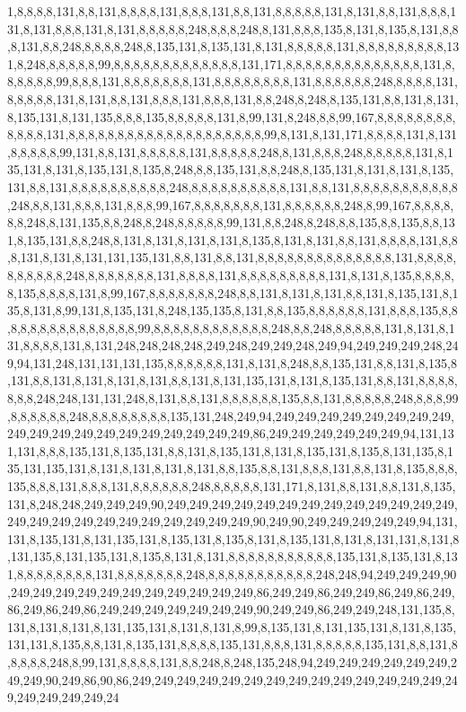 1,8,8,8,8,131,8,8,131,8,8,8,8,131,8,8,8,131,8,8,131,8,8,8,8,8,131,8,131,8,8,131,8,8,8,131,8,131,8,8,8,131,8,131,8,8,8,8,8,248,8,8,8,248,8,131,8,8,8,135,8,131,8,135,8,131,8,8,8,131,8,8,248,8,8,8,8,248,8,135,131,8,135,131,8,131,8,8,8,8,8,131,8,8,8,8,8,8,8,8,8,131,8,248,8,8,8,8,8,99,8,8,8,8,8,8,8,8,8,8,8,8,8,131,171,8,8,8,8,8,8,8,8,8,8,8,8,8,8,131,8,8,8,8,8,8,99,8,8,8,131,8,8,8,8,8,8,8,131,8,8,8,8,8,8,8,8,131,8,8,8,8,8,8,248,8,8,8,8,131,8,8,8,8,8,131,8,131,8,8,131,8,8,8,131,8,8,8,131,8,8,248,8,248,8,135,131,8,8,131,8,131,8,135,131,8,131,135,8,8,8,135,8,8,8,8,8,131,8,99,131,8,248,8,8,99,167,8,8,8,8,8,8,8,8,8,8,8,8,131,8,8,8,8,8,8,8,8,8,8,8,8,8,8,8,8,8,8,8,8,99,8,131,8,131,171,8,8,8,8,131,8,131,8,8,8,8,8,99,131,8,8,131,8,8,8,8,8,131,8,8,8,8,8,248,8,131,8,8,8,248,8,8,8,8,8,131,8,135,131,8,131,8,135,131,8,135,8,248,8,8,135,131,8,8,248,8,135,131,8,131,8,131,8,135,131,8,8,131,8,8,8,8,8,8,8,8,8,8,248,8,8,8,8,8,8,8,8,8,8,131,8,8,131,8,8,8,8,8,8,8,8,8,8,8,248,8,8,131,8,8,8,131,8,8,8,99,167,8,8,8,8,8,8,8,131,8,8,8,8,8,8,248,8,99,167,8,8,8,8,8,8,248,8,131,135,8,8,248,8,248,8,8,8,8,8,99,131,8,8,248,8,248,8,8,135,8,8,135,8,8,131,8,135,131,8,8,248,8,131,8,131,8,131,8,131,8,135,8,131,8,131,8,8,131,8,8,8,8,131,8,8,8,131,8,131,8,131,131,135,131,8,8,131,8,8,131,8,8,8,8,8,8,8,8,8,8,8,8,8,8,131,8,8,8,8,8,8,8,8,8,8,248,8,8,8,8,8,8,8,131,8,8,8,8,131,8,8,8,8,8,8,8,8,8,131,8,131,8,135,8,8,8,8,8,135,8,8,8,8,131,8,99,167,8,8,8,8,8,8,8,248,8,8,131,8,131,8,131,8,8,131,8,135,131,8,135,8,131,8,99,131,8,135,131,8,248,135,135,8,131,8,8,135,8,8,8,8,8,8,131,8,8,8,135,8,8,8,8,8,8,8,8,8,8,8,8,8,8,8,99,8,8,8,8,8,8,8,8,8,8,8,8,248,8,8,248,8,8,8,8,8,131,8,131,8,131,8,8,8,8,131,8,131,248,248,248,248,249,248,249,249,248,249,94,249,249,249,248,249,94,131,248,131,131,131,135,8,8,8,8,8,8,131,8,131,8,248,8,8,135,131,8,8,131,8,135,8,131,8,8,131,8,131,8,131,8,131,8,8,131,8,131,135,131,8,131,8,135,131,8,8,131,8,8,8,8,8,8,8,248,248,131,131,248,8,131,8,8,131,8,8,8,8,8,8,135,8,8,131,8,8,8,8,8,248,8,8,8,99,8,8,8,8,8,8,248,8,8,8,8,8,8,8,8,135,131,248,249,94,249,249,249,249,249,249,249,249,249,249,249,249,249,249,249,249,249,249,249,86,249,249,249,249,249,249,94,131,131,131,8,8,8,135,131,8,135,131,8,8,131,8,135,131,8,131,8,135,131,8,135,8,131,135,8,135,131,135,131,8,131,8,131,8,131,8,131,8,8,135,8,8,131,8,8,8,131,8,8,131,8,135,8,8,8,135,8,8,8,131,8,8,8,131,8,8,8,8,8,8,248,8,8,8,8,8,131,171,8,131,8,8,131,8,8,131,8,135,131,8,248,248,249,249,249,90,249,249,249,249,249,249,249,249,249,249,249,249,249,249,249,249,249,249,249,249,249,249,249,249,90,249,90,249,249,249,249,249,94,131,131,8,135,131,8,131,135,131,8,135,131,8,135,8,131,8,135,131,8,131,8,131,131,8,131,8,131,135,8,131,135,131,8,135,8,131,8,131,8,8,8,8,8,8,8,8,8,8,8,135,131,8,135,131,8,131,8,8,8,8,8,8,8,8,131,8,8,8,8,8,8,8,248,8,8,8,8,8,8,8,8,8,8,8,248,248,94,249,249,249,90,249,249,249,249,249,249,249,249,249,249,249,86,249,249,86,249,249,86,249,86,249,86,249,86,249,86,249,249,249,249,249,249,249,90,249,249,86,249,249,248,131,135,8,131,8,131,8,131,8,131,135,131,8,131,8,131,8,99,8,135,131,8,131,135,131,8,131,8,135,131,131,8,135,8,8,131,8,135,131,8,8,8,8,135,131,8,8,8,131,8,8,8,8,8,135,131,8,8,131,8,8,8,8,8,248,8,99,131,8,8,8,8,131,8,8,248,8,248,135,248,94,249,249,249,249,249,249,249,249,90,249,86,90,86,249,249,249,249,249,249,249,249,249,249,249,249,249,249,249,249,249,249,249,24